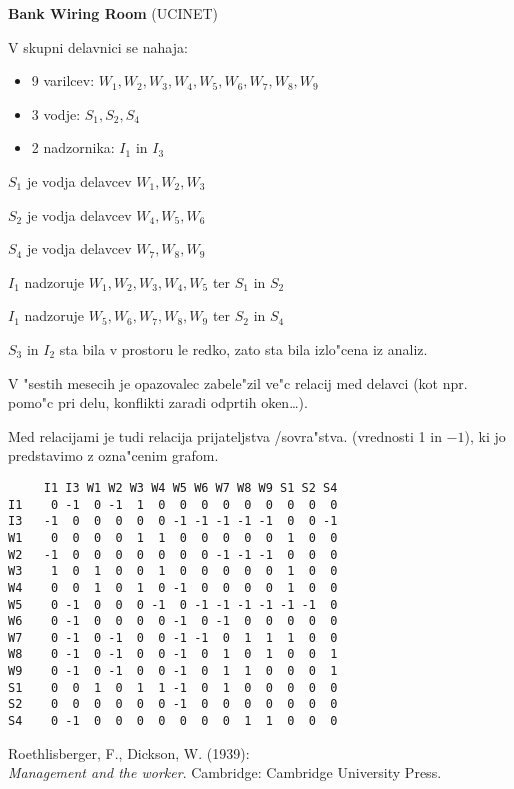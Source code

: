 \documentclass[12pt,a4paper]{article}
\begin{document}
\pagestyle{empty}

{\bf Bank Wiring Room} (UCINET)

V skupni delavnici se nahaja:
\begin{itemize}
\item 9 varilcev: $W_1, W_2, W_3, W_4, W_5, W_6, W_7, W_8, W_9$
\item 3 vodje: $S_1, S_2, S_4$
\item 2 nadzornika: $I_1$ in $I_3$
\end{itemize}

$S_1$ je vodja delavcev $W_1, W_2, W_3$

$S_2$ je vodja delavcev $W_4, W_5, W_6$

$S_4$ je vodja delavcev $W_7, W_8, W_9$

$I_1$ nadzoruje $W_1, W_2, W_3, W_4, W_5$ ter $S_1$ in $S_2$

$I_1$ nadzoruje $W_5, W_6, W_7, W_8, W_9$ ter $S_2$ in $S_4$

$S_3$ in $I_2$ sta bila v prostoru le redko, 
zato sta bila izlo"cena iz analiz.

V "sestih mesecih je opazovalec zabele"zil ve"c relacij
med delavci (kot npr. pomo"c pri delu, 
konflikti zaradi odprtih oken\ldots).

Med relacijami je tudi relacija prijateljstva /sovra"stva.
(vrednosti 1 in $-1$),
ki jo predstavimo z ozna"cenim grafom.

\begin{verbatim}
     I1 I3 W1 W2 W3 W4 W5 W6 W7 W8 W9 S1 S2 S4
I1    0 -1  0 -1  1  0  0  0  0  0  0  0  0  0
I3   -1  0  0  0  0  0 -1 -1 -1 -1 -1  0  0 -1
W1    0  0  0  0  1  1  0  0  0  0  0  1  0  0
W2   -1  0  0  0  0  0  0  0 -1 -1 -1  0  0  0
W3    1  0  1  0  0  1  0  0  0  0  0  1  0  0
W4    0  0  1  0  1  0 -1  0  0  0  0  1  0  0
W5    0 -1  0  0  0 -1  0 -1 -1 -1 -1 -1 -1  0
W6    0 -1  0  0  0  0 -1  0 -1  0  0  0  0  0
W7    0 -1  0 -1  0  0 -1 -1  0  1  1  1  0  0
W8    0 -1  0 -1  0  0 -1  0  1  0  1  0  0  1
W9    0 -1  0 -1  0  0 -1  0  1  1  0  0  0  1
S1    0  0  1  0  1  1 -1  0  1  0  0  0  0  0
S2    0  0  0  0  0  0 -1  0  0  0  0  0  0  0
S4    0 -1  0  0  0  0  0  0  0  1  1  0  0  0
\end{verbatim}

Roethlisberger, F., Dickson, W. (1939):\\
{\em Management and the worker}. Cambridge: Cambridge University Press.
\end{document}
